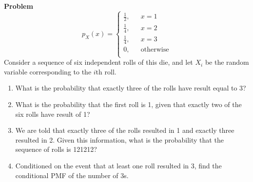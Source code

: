 \documentclass[12pt]{article}
\newenvironment{Ex}{\textbf{Problem}\vspace{.75em}\\}{}
\begin{document}
\begin{enumerate}
\begin{Ex}
\begin{equation*}
      p_X(x) = \left\{
        \begin{aligned}
          \frac{1}{2}, && x=1 \\
          \frac{1}{4}, && x=2 \\
          \frac{1}{4}, && x=3 \\
          0, && \text{otherwise} \\
        \end{aligned} \right.
    \end{equation*}
    Consider a sequence of six independent rolls of this die, and
    let $X_i$ be the random variable corresponding to the $i$th
    roll.
    \begin{enumerate}
    \item What is the probability that exactly three of the rolls
      have result equal to 3?
    \item What is the probability that the first roll is 1, given
      that exactly two of the six rolls have result of 1?
    \item We are told that exactly three of the rolls resulted in 1
      and exactly three resulted in 2. Given this information, what
      is the probability that the sequence of rolls is 121212?
    \item Conditioned on the event that at least one roll resulted
      in 3, find the conditional PMF of the number of 3s.
    \end{enumerate}
  \end{Ex}
\end{enumerate}
\end{document}
